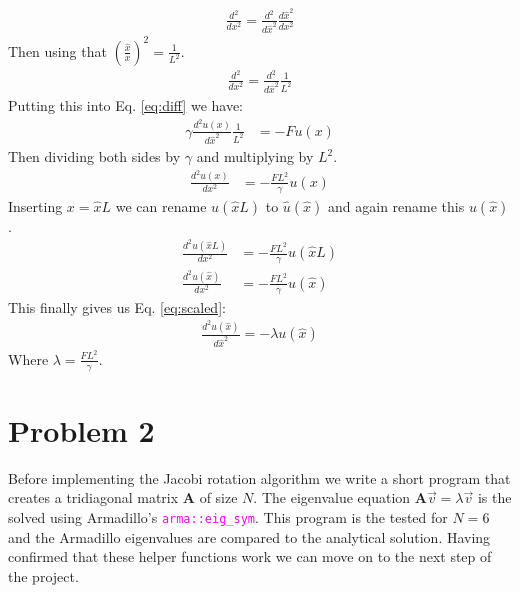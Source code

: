 \documentclass[english,notitlepage]{revtex4-1}  %
\begin{document}
\begin{align*}
    \frac{d^2}{dx^2} = \frac{d^2}{d\hat{x}^2} \frac{d\hat{x}^2}{dx^2}
\end{align*}
Then using that $\left(\frac{\hat{x}}{x} \right)^2 = \frac{1}{L^2}$.
\begin{align*}
    \frac{d^2}{dx^2} = \frac{d^2}{d\hat{x}^2} \frac{1}{L^2}
\end{align*}
Putting this into Eq. \ref*{eq:diff} we have:
\begin{align*}
    \gamma \frac{d^2 u(x)}{d\hat{x}^2} \frac{1}{L^2} &= - F u(x)
\end{align*}
Then dividing both sides by $\gamma$ and multiplying by $L^2$.
\begin{align*}
    \frac{d^2u(x)}{dx^2} &= - \frac{F L^2}{\gamma} u(x)
\end{align*}
Inserting $x = \hat{x}L$ we can rename $u(\hat{x}L)$ to $\hat{u}(\hat{x})$ and again rename this $u(\hat{x})$.
\begin{align*}
    \frac{d^2u(\hat{x}L)}{dx^2} &= - \frac{F L^2}{\gamma} u(\hat{x}L) \\
    \frac{d^2u(\hat{x})}{dx^2} &= - \frac{F L^2}{\gamma} u(\hat{x})
\end{align*}
This finally gives us Eq. \ref*{eq:scaled}:
\begin{align*}
    \frac{d^2u(\hat{x})}{d \hat{x}^2} = - \lambda u(\hat{x})
\end{align*}
Where $\lambda = \frac{F L^2}{\gamma}$.

\section*{Problem 2}
Before implementing the Jacobi rotation algorithm we write a short program
that creates a tridiagonal matrix $\textbf{A}$ of size $N$. The eigenvalue
equation $\textbf{A} \vec{v} = \lambda \vec{v}$ is the solved using Armadillo's \textcolor{magenta}{\texttt{arma::eig\_sym}}.
This program is the tested for $N = 6$ and the Armadillo eigenvalues are compared to the analytical solution.
Having confirmed that these helper functions work we can move on to the next step of the project.
\end{document}
